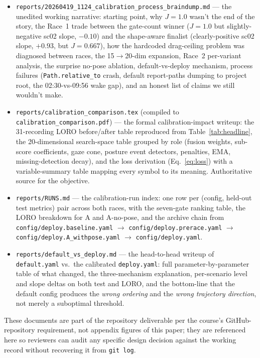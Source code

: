 \documentclass{article}
\newcommand{\code}[1]{\texttt{\small #1}}
\begin{document}
\begin{itemize}
  \item \code{reports/20260419\_1124\_calibration\_process\_braindump.md} --- the unedited working narrative: starting point, why $J=1.0$ wasn't the end of the story, the Race~1 trade between the gate-count winner ($J=1.0$ but slightly-negative sc02 slope, $-0.10$) and the shape-aware finalist (clearly-positive sc02 slope, $+0.93$, but $J=0.667$), how the hardcoded drag-ceiling problem was diagnosed between races, the 15$\to$20-dim expansion, Race~2 per-variant analysis, the surprise no-pose ablation, default-vs-deploy mechanism, process failures (\code{Path.relative\_to} crash, default report-paths dumping to project root, the 02:30-vs-09:56 wake gap), and an honest list of claims we still wouldn't make.
  \item \code{reports/calibration\_comparison.tex} (compiled to \code{calibration\_comparison.pdf}) --- the formal calibration-impact writeup: the 31-recording LORO before/after table reproduced from Table~\ref{tab:headline}, the 20-dimensional search-space table grouped by role (fusion weights, sub-score coefficients, gaze cone, posture event detectors, penalties, EMA, missing-detection decay), and the loss derivation (Eq.~\ref{eq:loss}) with a variable-summary table mapping every symbol to its meaning. Authoritative source for the objective.
  \item \code{reports/RUNS.md} --- the calibration-run index: one row per (config, held-out test metrics) pair across both races, with the seven-gate ranking table, the LORO breakdown for A and A-no-pose, and the archive chain from \code{config/deploy.baseline.yaml} $\to$ \code{config/deploy.prerace.yaml} $\to$ \code{config/deploy.A\_withpose.yaml} $\to$ \code{config/deploy.yaml}.
  \item \code{reports/default\_vs\_deploy.md} --- the head-to-head writeup of \code{default.yaml} vs.\ the calibrated \code{deploy.yaml}: full parameter-by-parameter table of what changed, the three-mechanism explanation, per-scenario level and slope deltas on both test and LORO, and the bottom-line that the default config produces the \emph{wrong ordering} and the \emph{wrong trajectory direction}, not merely a suboptimal threshold.
\end{itemize}

These documents are part of the repository deliverable per the course's GitHub-repository requirement, not appendix figures of this paper; they are referenced here so reviewers can audit any specific design decision against the working record without recovering it from \code{git log}.
\end{document}

